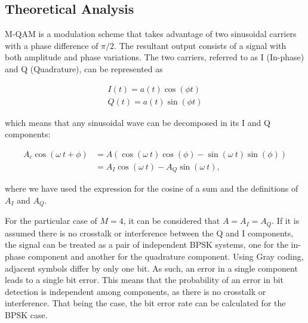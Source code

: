 \begin{refsection}

\subsection{Theoretical Analysis}

M-QAM is a modulation scheme that takes advantage of two sinusoidal carriers
with a phase difference of $\pi/2$. The resultant output consists of a signal
with both amplitude and phase variations. The two carriers, referred to as I
(In-phase) and Q (Quadrature), can be represented as

\begin{align}
	I(t)=a(t)\cos(\phi t) \\
	Q(t)=a(t)\sin(\phi t)
\end{align}

which means that any sinusoidal wave can be decomposed in its I and Q components:

\begin{align}
	A_c\cos(\omega~t+\phi)&=A\left(\cos(\omega~t)\cos(\phi)-\sin(\omega~t)\sin(\phi)\right) \\
	&=A_I\cos(\omega~t)-A_Q\sin(\omega~t),
\end{align}

where we have used the expression for the cosine of a sum and the definitions of $A_I$ and $A_Q$.

For the particular case of $M=4$, it can be considered that $A=A_I=A_Q$. If it
is assumed there is no crosstalk or interference between the Q and I components,
the signal can be treated as a pair of independent BPSK systems, one for the
in-phase component and another for the quadrature component.
Using Gray coding, adjacent symbols differ by only one bit. As such, an error in a single component leads to a single bit error.
This means that the probability of an error in bit detection is independent
among components, as there is no crosstalk or interference. That being the case,
the bit error rate can be calculated for the BPSK case.



\end{refsection}
